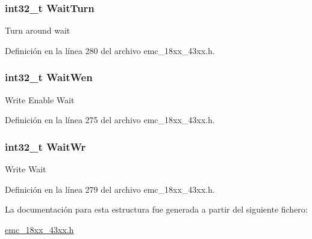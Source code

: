 \subsubsection[{\texorpdfstring{Wait\+Turn}{WaitTurn}}]{\setlength{\rightskip}{0pt plus 5cm}int32\+\_\+t Wait\+Turn}\hypertarget{struct_i_p___e_m_c___s_t_a_t_i_c___c_o_n_f_i_g___t_a56dcec9bd2a8a86669271468dc424f97}{}\label{struct_i_p___e_m_c___s_t_a_t_i_c___c_o_n_f_i_g___t_a56dcec9bd2a8a86669271468dc424f97}
Turn around wait 

Definición en la línea 280 del archivo emc\+\_\+18xx\+\_\+43xx.\+h.

\subsubsection[{\texorpdfstring{Wait\+Wen}{WaitWen}}]{\setlength{\rightskip}{0pt plus 5cm}int32\+\_\+t Wait\+Wen}\hypertarget{struct_i_p___e_m_c___s_t_a_t_i_c___c_o_n_f_i_g___t_ad785fff7b2fa061c10fd68dfbe965ef2}{}\label{struct_i_p___e_m_c___s_t_a_t_i_c___c_o_n_f_i_g___t_ad785fff7b2fa061c10fd68dfbe965ef2}
Write Enable Wait 

Definición en la línea 275 del archivo emc\+\_\+18xx\+\_\+43xx.\+h.

\subsubsection[{\texorpdfstring{Wait\+Wr}{WaitWr}}]{\setlength{\rightskip}{0pt plus 5cm}int32\+\_\+t Wait\+Wr}\hypertarget{struct_i_p___e_m_c___s_t_a_t_i_c___c_o_n_f_i_g___t_adb3edc7aa6d809b98760eb42e6afcd89}{}\label{struct_i_p___e_m_c___s_t_a_t_i_c___c_o_n_f_i_g___t_adb3edc7aa6d809b98760eb42e6afcd89}
Write Wait 

Definición en la línea 279 del archivo emc\+\_\+18xx\+\_\+43xx.\+h.



La documentación para esta estructura fue generada a partir del siguiente fichero\+:\begin{DoxyCompactItemize}
\item 
\hyperlink{emc__18xx__43xx_8h}{emc\+\_\+18xx\+\_\+43xx.\+h}\end{DoxyCompactItemize}
